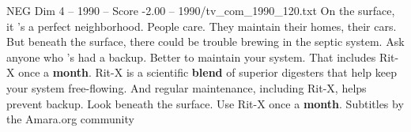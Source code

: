 \begin{textsample}{NEG Dim 4 – 1990 – Score -2.00 – 1990/tv\_com\_1990\_120.txt}  \label{ex:f4_neg_071}
On the surface, it 's a perfect neighborhood.
People care.
They maintain their homes, their cars.
But beneath the surface, there could be trouble brewing in the septic system.
Ask anyone who 's had a backup.
Better to maintain your system.
That includes Rit-X once a \textbf{month}.
Rit-X is a scientific \textbf{blend} of superior digesters that help keep your system free-flowing.
And regular maintenance, including Rit-X, helps prevent backup.
Look beneath the surface.
Use Rit-X once a \textbf{month}.
Subtitles by the Amara.org community

\end{textsample}
